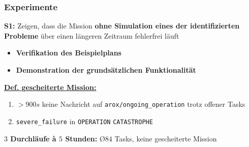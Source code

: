 \documentclass{beamer}
\newcommand{\code}[1]{\colorbox{light-gray}{\texttt{#1}}}
\begin{document}
\begin{frame}
  \frametitle{Experimente}
  \textbf{S1:} Zeigen, dass die Mission \textbf{ohne Simulation eines der identifizierten Probleme} über einen längeren Zeitraum fehlerfrei läuft
  \begin{itemize}
    \item \textbf{Verifikation des Beispielplans}
    \item \textbf{Demonstration der grundsätzlichen Funktionalität}
  \end{itemize}
  \underline{\textbf{Def. gescheiterte Mission:}}
  \begin{enumerate}
    \item $> 900s$ keine Nachricht auf \code{arox/ongoing\_operation} trotz offener Tasks
    \item \code{severe\_failure} in \code{OPERATION} \textrightarrow \thinspace \code{CATASTROPHE}
  \end{enumerate}
  \textbf{$3$ Durchläufe à $5$ Stunden:}\newline
  \textrightarrow \thinspace \O $84$ Tasks, keine gescheiterte Mission
\end{frame}
\end{document}
